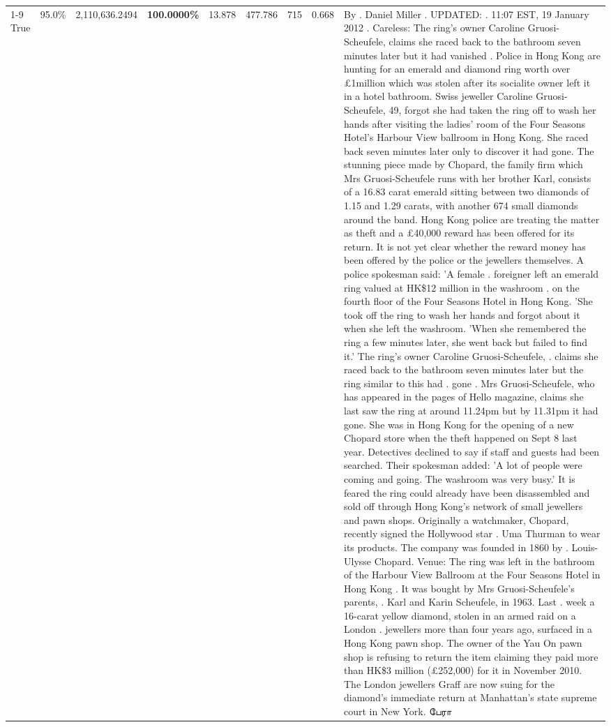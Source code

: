 \begin{table}[H]
\begin{tabular}{lllrlllll}
\cline{1-9}
True & 95.0\% & 2,110,636.2494 & \bfseries \color{red} 100.0000\% & 13.878 & 477.786 & 715 & 0.668 & By . Daniel Miller . UPDATED: . 11:07 EST, 19 January 2012 . Careless: The ring's owner Caroline Gruosi-Scheufele, claims she raced back to the bathroom seven minutes later but it had vanished . Police in Hong Kong are hunting for an emerald and diamond ring worth over £1million which was stolen after its socialite owner left it in a hotel bathroom. Swiss jeweller Caroline Gruosi-Scheufele, 49, forgot she had taken the ring off to wash her hands after visiting the ladies' room of the Four Seasons Hotel's Harbour View ballroom in Hong Kong. She raced back seven minutes later only to discover it had gone. The stunning piece made by Chopard, the family firm which Mrs Gruosi-Scheufele runs with her brother Karl, consists of a 16.83 carat emerald sitting between two diamonds of 1.15 and 1.29 carats, with another 674 small diamonds around the band. Hong Kong police are treating the matter as theft and a £40,000 reward has been offered for its return. It is not yet clear whether the reward money has been offered by the police or the jewellers themselves. A police spokesman said: 'A female . foreigner left an emerald ring valued at HK\$12 million in the washroom . on the fourth floor of the Four Seasons Hotel in Hong Kong. 'She took off the ring to wash her hands and forgot about it when she left the washroom. 'When she remembered the ring a few minutes later, she went back but failed to find it.' The ring's owner Caroline Gruosi-Scheufele, . claims she raced back to the bathroom seven minutes later but the ring similar to this had . gone . Mrs Gruosi-Scheufele, who has appeared in the pages of Hello magazine, claims she last saw the ring at around 11.24pm but by 11.31pm it had gone. She was in Hong Kong for the opening of a new Chopard store when the theft happened on Sept 8 last year. Detectives declined to say if staff and guests had been searched. Their spokesman added: 'A lot of people were coming and going. The washroom was very busy.' It is feared the ring could already have been disassembled and sold off through Hong Kong's network of small jewellers and pawn shops. Originally a watchmaker, Chopard, recently signed the Hollywood star . Uma Thurman to wear its products. The company was founded in 1860 by . Louis-Ulysse Chopard. Venue: The ring was left in the bathroom of the Harbour View Ballroom at the Four Seasons Hotel in Hong Kong . It was bought by Mrs Gruosi-Scheufele's  parents, . Karl and Karin Scheufele, in 1963. Last . week a 16-carat yellow diamond, stolen in an armed raid on a London . jewellers more than four years ago, surfaced in a Hong Kong pawn shop. The owner of the Yau On pawn shop is refusing to return the item claiming they paid more than HK\$3 million (£252,000) for it in November 2010. The London jewellers Graff are now suing for the diamond’s immediate return at Manhattan’s state supreme court in New York. பேரா \\

\end{tabular}
\end{table}
